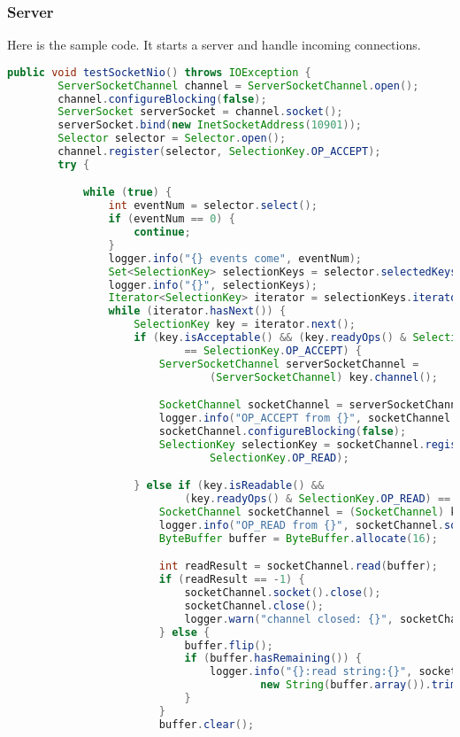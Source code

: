 \documentclass[12pt]{article}
\begin{document}
\subsubsection*{Server}
Here is the sample code. It starts a server and handle incoming connections.
\begin{lstlisting}[language=Java]
public void testSocketNio() throws IOException {
        ServerSocketChannel channel = ServerSocketChannel.open();
        channel.configureBlocking(false);
        ServerSocket serverSocket = channel.socket();
        serverSocket.bind(new InetSocketAddress(10901));
        Selector selector = Selector.open();
        channel.register(selector, SelectionKey.OP_ACCEPT);
        try {

            while (true) {
                int eventNum = selector.select();
                if (eventNum == 0) {
                    continue;
                }
                logger.info("{} events come", eventNum);
                Set<SelectionKey> selectionKeys = selector.selectedKeys();
                logger.info("{}", selectionKeys);
                Iterator<SelectionKey> iterator = selectionKeys.iterator();
                while (iterator.hasNext()) {
                    SelectionKey key = iterator.next();
                    if (key.isAcceptable() && (key.readyOps() & SelectionKey.OP_ACCEPT)
                            == SelectionKey.OP_ACCEPT) {
                        ServerSocketChannel serverSocketChannel =
                                (ServerSocketChannel) key.channel();

                        SocketChannel socketChannel = serverSocketChannel.accept();
                        logger.info("OP_ACCEPT from {}", socketChannel.socket().getPort());
                        socketChannel.configureBlocking(false);
                        SelectionKey selectionKey = socketChannel.register(selector,
                                SelectionKey.OP_READ);

                    } else if (key.isReadable() &&
                            (key.readyOps() & SelectionKey.OP_READ) == SelectionKey.OP_READ) {
                        SocketChannel socketChannel = (SocketChannel) key.channel();
                        logger.info("OP_READ from {}", socketChannel.socket().getPort());
                        ByteBuffer buffer = ByteBuffer.allocate(16);

                        int readResult = socketChannel.read(buffer);
                        if (readResult == -1) {
                            socketChannel.socket().close();
                            socketChannel.close();
                            logger.warn("channel closed: {}", socketChannel.socket().getPort());
                        } else {
                            buffer.flip();
                            if (buffer.hasRemaining()) {
                                logger.info("{}:read string:{}", socketChannel.socket().getPort(),
                                        new String(buffer.array()).trim());
                            }
                        }
                        buffer.clear();


\end{lstlisting}
\end{document}
